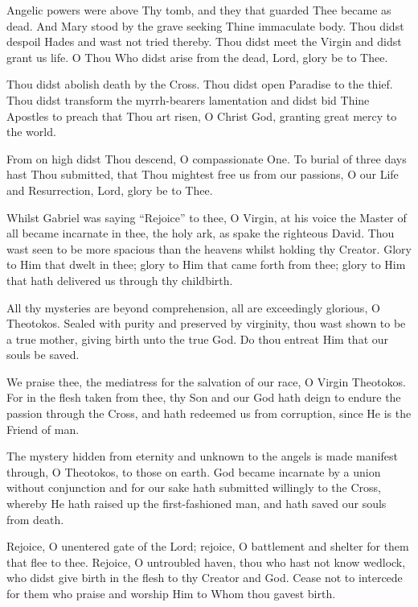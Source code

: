 \documentclass[
  14pt,
  letterpaper,
  openright,
  twocolumn,
  twoside]{memoir}
\begin{document}
 Angelic powers were above Thy tomb, and they that guarded Thee became as dead. And Mary stood by the grave seeking Thine immaculate body. Thou didst despoil Hades and wast not tried thereby. Thou didst meet the Virgin and didst grant us life. O Thou Who didst arise from the dead, Lord, glory be to Thee.

 Thou didst abolish death by the Cross. Thou didst open Paradise to the thief. Thou didst transform the myrrh-bearers lamentation and didst bid Thine Apostles to preach that Thou art risen, O Christ God, granting great mercy to the world.

 From on high didst Thou descend, O compassionate One. To burial of three days hast Thou submitted, that Thou mightest free us from our passions, O our Life and Resurrection, Lord, glory be to Thee.


 Whilst Gabriel was saying ``Rejoice'' to thee, O Virgin, at his voice the Master of all became incarnate in thee, the holy ark, as spake the righteous David. Thou wast seen to be more spacious than the heavens whilst holding thy Creator. Glory to Him that dwelt in thee; glory to Him that came forth from thee; glory to Him that hath delivered us through thy childbirth.

 All thy mysteries are beyond comprehension, all are exceedingly glorious, O Theotokos. Sealed with purity and preserved by virginity, thou wast shown to be a true mother, giving birth unto the true God. Do thou entreat Him that our souls be saved.

 We praise thee, the mediatress for the salvation of our race, O Virgin Theotokos. For in the flesh taken from thee, thy Son and our God hath deign to endure the passion through the Cross, and hath redeemed us from corruption, since He is the Friend of man.

 The mystery hidden from eternity and unknown to the angels is made manifest through, O Theotokos, to those on earth. God became incarnate by a union without conjunction and for our sake hath submitted willingly to the Cross, whereby He hath raised up the first-fashioned man, and hath saved our souls from death.

 Rejoice, O unentered gate of the Lord; rejoice, O battlement and shelter for them that flee to thee. Rejoice, O untroubled haven, thou who hast not know wedlock, who didst give birth in the flesh to thy Creator and God. Cease not to intercede for them who praise and worship Him to Whom thou gavest birth.
\end{document}
